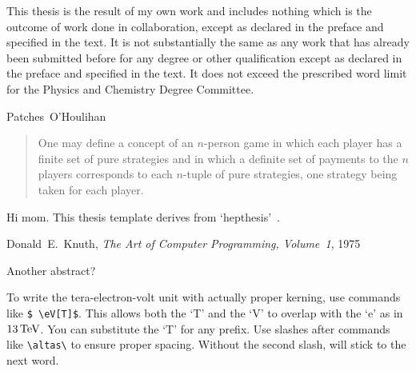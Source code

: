 

\begin{singlespacing}
\begin{declaration}
\noindent
This thesis is the result of my own work and includes nothing which is the
outcome of work done in collaboration, except as declared in the preface and
specified in the text.
%
It is not substantially the same as any work that has already been submitted
before for any degree or other qualification except as declared in the preface
and specified in the text.
%
It does not exceed the prescribed word limit for the
%
Physics and Chemistry
%
Degree Committee.
\vspace*{1cm}
\begin{flushright}
Patches~O'Houlihan
\end{flushright}
\end{declaration}
\end{singlespacing}


\begin{abstract}
One may define a concept of an $n$-person game in which each player has a
finite set of pure strategies and in which a definite set of payments to the
$n$ players corresponds to each $n$-tuple of pure strategies, one strategy
being taken for each player.
\end{abstract}



\begin{acknowledgements}
Hi mom.
This thesis template derives from `hepthesis'~\cite{hepthesis}.
\end{acknowledgements}


\begin{preface}
\begin{singlespacing}
\begin{epigraphs}
%
{Donald~E.~Knuth,
\textit{The Art of Computer Programming, Volume~1},
1975~\cite{knuth1975art}}
\end{epigraphs}
\end{singlespacing}
\noindent
Another abstract?

To write the tera-electron-volt unit with actually proper kerning, use commands
like \texttt{\$\,\textbackslash eV[T]\$}.
This allows both the `T' and the `V' to overlap with the `e' as in
$13\,\eV[T]$.
You can substitute the `T' for any prefix.
Use slashes after commands like \texttt{\textbackslash altas\textbackslash} to
ensure proper spacing.
Without the second slash, \atlas will stick to the next word.

\end{preface}

\tableofcontents

\thispagestyle{empty}
